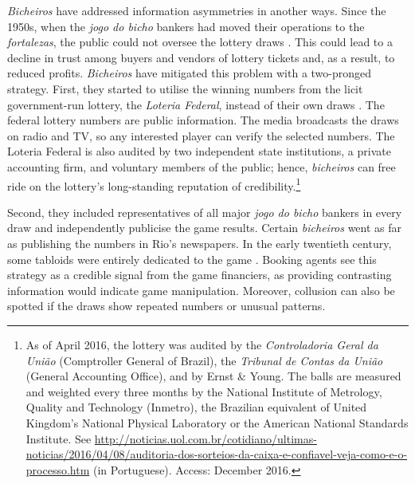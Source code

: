 \emph{Bicheiros} have addressed information asymmetries in another ways. Since the 1950s, when the \emph{jogo do bicho} bankers had moved their operations to the \emph{fortalezas}, the public could not oversee the lottery draws \citep[259]{chazkel2011laws}. This could lead to a decline in trust among buyers and vendors of lottery tickets and, as a result, to reduced profits. \emph{Bicheiros} have mitigated this problem with a two-pronged strategy. First, they started to utilise the winning numbers from the licit government-run lottery, the \emph{Loteria Federal}, instead of their own draws \citetext{\citealp[546]{chazkel2007beyond}; \citealp[89]{labronici2012paratodos}; \citealp[39-40]{mello1989historia}}. The federal lottery numbers are public information. The media broadcasts the draws on radio and TV, so any interested player can verify the selected numbers. The Loteria Federal is also audited by two independent state institutions, a private accounting firm, and voluntary members of the public; hence, \emph{bicheiros} can free ride on the lottery's long-standing reputation of credibility.\footnote{As of April 2016, the lottery was audited by the \emph{Controladoria Geral da União} (Comptroller General of Brazil), the \emph{Tribunal de Contas da União} (General Accounting Office), and by Ernst \& Young. The balls are measured and weighted every three months by the National Institute of Metrology, Quality and Technology (Inmetro), the Brazilian equivalent of United Kingdom's National Physical Laboratory or the American National Standards Institute. See \url{http://noticias.uol.com.br/cotidiano/ultimas-noticias/2016/04/08/auditoria-dos-sorteios-da-caixa-e-confiavel-veja-como-e-o-processo.htm} (in Portuguese). Access: December 2016.}


Second, they included representatives of all major \emph{jogo do bicho} bankers in every draw and independently publicise the game results. Certain \emph{bicheiros} went as far as publishing the numbers in Rio's newspapers. In the early twentieth century, some tabloids were entirely dedicated to the game \citep[60]{magalhaes2005ganhou}. Booking agents see this strategy as a credible signal from the game financiers, as providing contrasting information would indicate game manipulation. Moreover, collusion can also be spotted if the draws show repeated numbers or unusual patterns.

